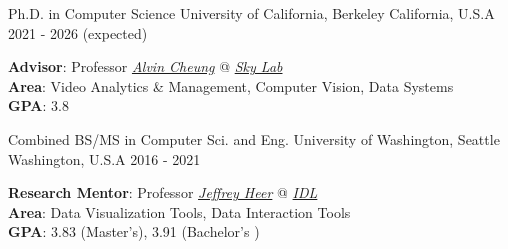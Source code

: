 
\begin{cventries}

\vspace{-4.0mm}
\begin{multicols}{2}

  \cventrycol
    {Ph.D. in Computer Science} %
    {University of California, Berkeley} %
    {California, U.S.A} %
    {2021 - 2026 (expected)} %
    {
      \vspace{-4.0mm}
      \begin{justify}
        \textbf{Advisor}: Professor \href{https://people.eecs.berkeley.edu/~akcheung/}{\textit{Alvin Cheung}} @ \href{https://sky.cs.berkeley.edu/}{\textit{Sky Lab}}\\
        \textbf{Area}: Video Analytics \& Management, Computer Vision, Data Systems\\
        \textbf{GPA}: 3.8
      \end{justify}
    }
  \cventrycol
    {Combined BS/MS in Computer Sci. and Eng.} %
    {University of Washington, Seattle} %
    {Washington, U.S.A} %
    {2016 - 2021} %
    {
      \vspace{-4.0mm}
      \begin{justify}
        \textbf{Research Mentor}: Professor \href{https://homes.cs.washington.edu/~jheer/}{\textit{Jeffrey Heer}} @ \href{https://idl.cs.washington.edu/}{\textit{IDL}}\\
        \textbf{Area}: Data Visualization Tools, Data Interaction Tools\\
        \textbf{GPA}: 3.83 (Master's), 3.91 (Bachelor's )
      \end{justify}
    }
\end{multicols}
\vspace{-8mm}
\end{cventries}
